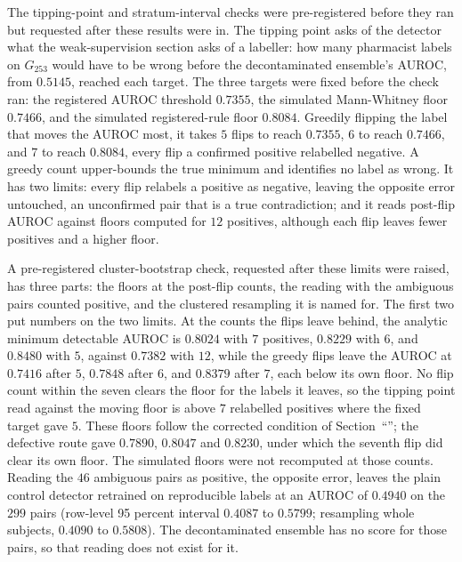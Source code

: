 The tipping-point and stratum-interval checks were pre-registered before
they ran but requested after these results were in. The tipping point asks of the detector what the
weak-supervision section asks of a labeller: how many pharmacist labels on $G_{253}$ would have to be wrong before the
decontaminated ensemble's AUROC, from $0.5145$, reached each target. The three targets were fixed before the check
ran: the registered AUROC threshold $0.7355$, the simulated Mann-Whitney floor
$0.7466$, and the simulated registered-rule floor $0.8084$. Greedily flipping the label that moves the AUROC
most, it takes $5$ flips to reach $0.7355$, $6$ to reach $0.7466$, and $7$ to reach $0.8084$, every flip a confirmed
positive relabelled negative. A greedy count upper-bounds the true minimum and identifies no label as wrong. It has two limits:
every flip relabels a positive as negative, leaving the opposite error untouched, an unconfirmed pair that is a true
contradiction; and it reads post-flip AUROC against floors computed for $12$ positives, although each flip leaves fewer
positives and a higher floor.

A pre-registered cluster-bootstrap check, requested after these limits were raised, has three parts: the floors at the
post-flip counts, the reading with the ambiguous pairs counted positive, and the clustered resampling it is named for.
The first two put numbers on the two limits. At the counts the flips leave behind, the analytic minimum detectable
AUROC is $0.8024$ with $7$ positives, $0.8229$ with $6$, and $0.8480$ with $5$, against $0.7382$ with $12$, while the
greedy flips leave the AUROC at $0.7416$ after $5$, $0.7848$ after $6$, and $0.8379$ after $7$, each below its own
floor. No flip count within the seven clears the floor for the labels it leaves, so the tipping point read against the
moving floor is above $7$ relabelled positives where the fixed target gave $5$. These floors follow the corrected
condition of Section~``''; the defective route gave $0.7890$, $0.8047$ and $0.8230$, under which the
seventh flip did clear its own floor. The simulated floors were not recomputed at those counts. Reading the $46$
ambiguous pairs as positive, the opposite error, leaves the plain control detector retrained on reproducible labels at
an AUROC of $0.4940$ on the $299$ pairs (row-level 95 percent interval $0.4087$ to $0.5799$; resampling whole subjects,
$0.4090$ to $0.5808$). The decontaminated ensemble has no score for those pairs, so that reading does not exist for
it.

